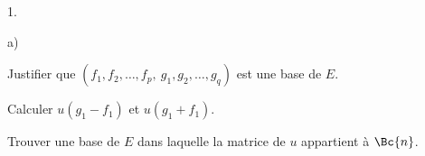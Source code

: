 \documentclass[11pt]{article}%
\begin{document}
\begin{noliste}{1.}
\begin{noliste}{a)}
  \item Justifier que $(f_1, f_2, \hdots, f_p, \ g_1,g_2,\hdots,g_q)$
    est une base de $E$.
    
    
  
  \item Calculer $u(g_1-f_1)$ et $u(g_1+f_1)$.
    
    
    
  \item Trouver une base de $E$ dans laquelle la matrice de $u$
    appartient à $\Bc{n}$.
	
    
\end{noliste}

\end{noliste}
\end{document}
